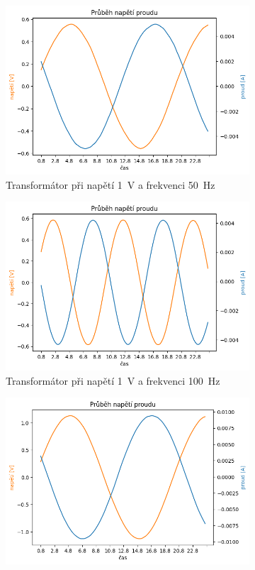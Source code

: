 \documentclass[a4paper]{article}
\begin{document}
\begin{figure}[h!]
	\centering
	\begin{subfigure}{0.49\textwidth}
		\includegraphics[width=\textwidth]{Trafo3b_1V_50Hz.png}
		\caption{Transformátor při napětí \SI{1}{\volt} a frekvenci \SI{50}{\hertz}}
	\end{subfigure}
	\hfill
	\begin{subfigure}{0.49\textwidth}
		\includegraphics[width=\textwidth]{Trafo3b_1V_100Hz.png}
		\caption{Transformátor při napětí \SI{1}{\volt} a frekvenci \SI{100}{\hertz}}
	\end{subfigure}
	\hfill
	\begin{subfigure}{0.49\textwidth}
		\includegraphics[width=\textwidth]{Trafo3b_2V_50Hz.png}

\end{subfigure}
\end{figure}
\end{document}
